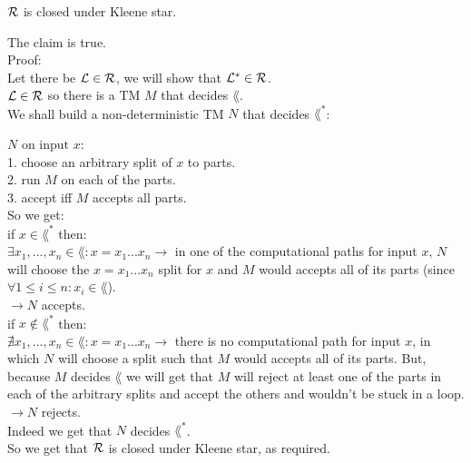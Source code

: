 $\mathcal{R}$ is closed under Kleene star.

The claim is true. \\

Proof: \\
Let there be $\mathcal{L} \in \mathcal{R}$, we will show that $\mathcal{L}^* \in \mathcal{R}$. \\
$\mathcal{L} \in \mathcal{R}$ so there is a TM $M$ that decides $\lang$. \\
We shall build a non-deterministic TM $N$ that decides $\lang^*$:

$N \text{ on input } x$: \\
1. choose an arbitrary split of $x$ to parts. \\
2. run $M$ on each of the parts. \\
3. accept iff $M$ accepts all parts. \\

So we get: \\
if $x \in \lang^*$ then: \\
$\exists x_1,...,x_n \in \lang: x=x_1...x_n \rightarrow $ in one of the computational
paths for input $x$, $N$ will choose the $x=x_1...x_n$ split for $x$ and $M$ would accepts all of its parts
(since $\forall 1 \leq i \leq n: x_i \in \lang$). \\
$\rightarrow N$ accepts. \\

if $x \notin \lang^*$ then: \\
$\nexists x_1,...,x_n \in \lang: x=x_1...x_n \rightarrow $ there is no computational
path for input $x$, in which $N$ will choose a split such that $M$ would accepts all of its parts.
But, because $M$ decides $\lang$ we will get that $M$ will reject at least one of the parts in
each of the arbitrary splits and accept the others and wouldn't be stuck in a loop. \\
$\rightarrow N$ rejects. \\

Indeed we get that $N$ decides $\lang^*$. \\
So we get that $\mathcal{R}$ is closed under Kleene star, as required. \\

